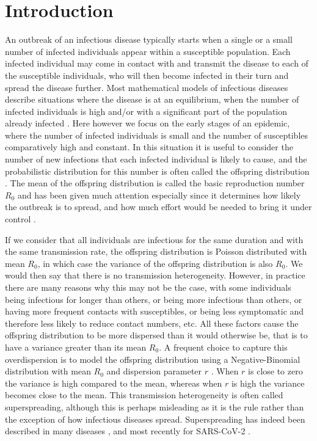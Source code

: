\documentclass{article}
\begin{document}
\newpage
\section{Introduction}

An outbreak of an infectious disease typically starts when a single or a small number
of infected individuals appear within a susceptible population. Each infected individual
may come in contact with and transmit the disease to each of the susceptible individuals, who will then
become infected in their turn and spread the disease further. Most mathematical models of infectious diseases
describe situations where the disease is at an equilibrium, when the number
of infected individuals is high and/or with a significant part of the population already infected
\citep{Anderson1991,keeling2008modeling}. 
Here however we focus on the early stages of an epidemic, where the number of 
infected individuals is small and the number of susceptibles comparatively high and constant.
In this situation it is useful to consider the number of new infections that each infected
individual is likely to cause, and the probabilistic distribution for this number is often called
the offspring distribution \citep{Grassly2008}. 
The mean of the offspring distribution is called the basic
reproduction number $R_0$ and has been given much attention especially since
it determines how likely the outbreak is to spread, and how much effort would be needed
to bring it under control \citep{fraserFactorsThatMake2004,fergusonStrategiesMitigatingInfluenza2006}. 

If we consider that all
individuals are infectious for the same duration and with the same transmission rate,
the offspring distribution is Poisson distributed with mean $R_0$, in which case the variance
of the offspring distribution is also $R_0$. We would then say that there is no transmission
heterogeneity. However, in practice there are many reasons why this may not be the case,
with some individuals being infectious for longer than others, or being more infectious than others, or 
having more frequent contacts with susceptibles, or being less symptomatic and therefore less likely
to reduce contact numbers, etc. All these factors cause the offspring distribution to be more 
dispersed than it would otherwise be, that is to have a variance greater than its mean $R_0$. 
A frequent choice to capture this overdispersion is to model the offspring distribution
using a Negative-Binomial distribution with mean $R_0$ and dispersion parameter $r$
\citep{Lloyd-Smith2005,Grassly2008}. When $r$ is close to zero the variance is high compared to the mean,
whereas when $r$ is high the variance becomes close to the mean. This transmission heterogeneity
is often called superspreading, although this is perhaps misleading
as it is the rule rather than the exception of how infectious diseases spread. Superspreading has
indeed been described in many diseases \citep{woolhouseHeterogeneitiesTransmissionInfectious1997,
steinSuperspreadersInfectiousDiseases2011,kucharskiRoleSuperspreadingMiddle2015,
wangSuperspreadingHeterogeneityTransmission2021}, 
and most recently for 
SARS-CoV-2 \citep{Wang2020,lemieuxPhylogeneticAnalysisSARSCoV22021,gomez-carballaSuperspreadingEmergenceCOVID192021,duSystematicReviewMetaanalyses2022}.
\end{document}
